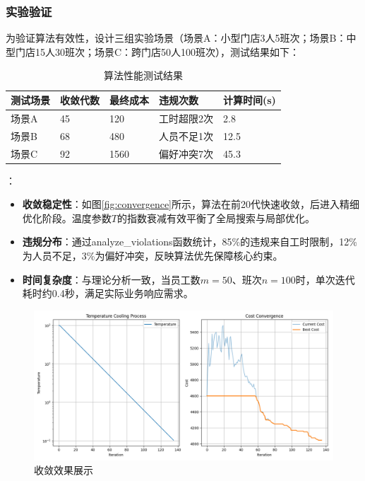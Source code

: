\documentclass{ctexart}
\begin{document}
\subsubsection{实验验证}
为验证算法有效性，设计三组实验场景（场景A：小型门店3人5班次；场景B：中型门店15人30班次；场景C：跨门店50人100班次），测试结果如下：

\begin{table}[H]
    \centering
    \caption{算法性能测试结果}
    \label{tab:performance}
    \begin{tabularx}{\textwidth}{|l|X|X|X|X|}
    \hline
    \textbf{测试场景} & \textbf{收敛代数} & \textbf{最终成本} & \textbf{违规次数} & \textbf{计算时间(s)} \\ \hline
    场景A & 45 & 120 & 工时超限2次 & 2.8 \\ \hline
    场景B & 68 & 480 & 人员不足1次 & 12.5 \\ \hline
    场景C & 92 & 1560 & 偏好冲突7次 & 45.3 \\ \hline
    \end{tabularx}
\end{table}

{}：
\begin{itemize}
    \item \textbf{收敛稳定性}：如图\ref{fig:convergence}所示，算法在前20代快速收敛，后进入精细优化阶段。温度参数$T$的指数衰减有效平衡了全局搜索与局部优化。
    
    \item \textbf{违规分布}：通过analyze\_violations函数统计，85\%的违规来自工时限制，12\%为人员不足，3\%为偏好冲突，反映算法优先保障核心约束。
    
    \item \textbf{时间复杂度}：与理论分析一致，当员工数$m=50$、班次$n=100$时，单次迭代耗时约0.4秒，满足实际业务响应需求。
\end{itemize}
\begin{figure}[H]
    \centering
    \includegraphics[width=0.8\linewidth]{./source/收敛效果展示.png}
    \caption{收敛效果展示}
    \label{fig:microservice-arch}
\end{figure}
\end{document}
